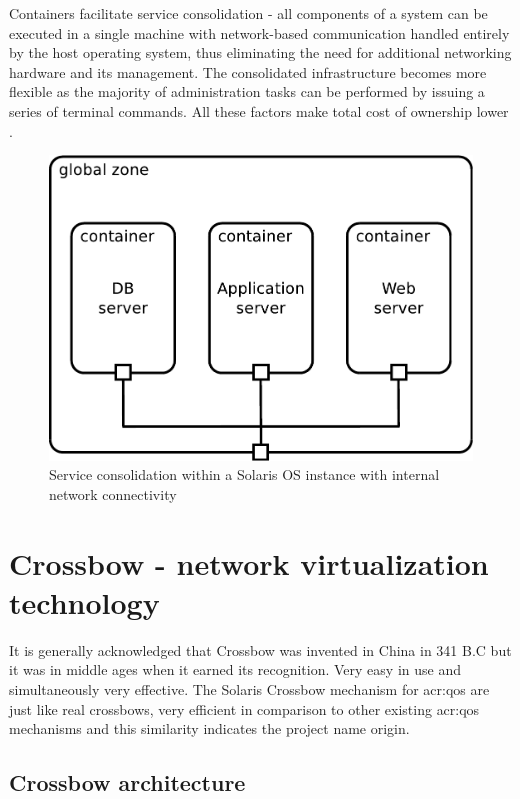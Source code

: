 \documentclass[11pt]{book}
\begin{document}
        Containers facilitate service consolidation - all components of a system can be executed in a single machine
        with network-based communication handled entirely by the host operating system, thus eliminating the need for
        additional networking hardware and its management. The consolidated infrastructure becomes more flexible as the
        majority of administration tasks can be performed by issuing a series of terminal commands. All these factors
        make total cost of ownership lower \cite{price}.

        \begin{figure}[H]
          \begin{center}
            \includegraphics[width=.6\textwidth]{img/solaris/consolidation.pdf}
          \end{center}

          \caption{Service consolidation within a Solaris OS instance with internal network connectivity}
        \end{figure}


    \section{Crossbow - network virtualization technology}
    \label{sec:sol:xbow}


      It is generally acknowledged that Crossbow was invented in China in 341 B.C but it was in middle ages when 
      it earned its recognition. Very easy in use and simultaneously very effective. The Solaris Crossbow mechanism 
      for \gls{acr:qos} are just like real crossbows, very efficient in comparison to other existing \gls{acr:qos} mechanisms and this
      similarity indicates the project name origin.


      \subsection{Crossbow architecture}
\end{document}
